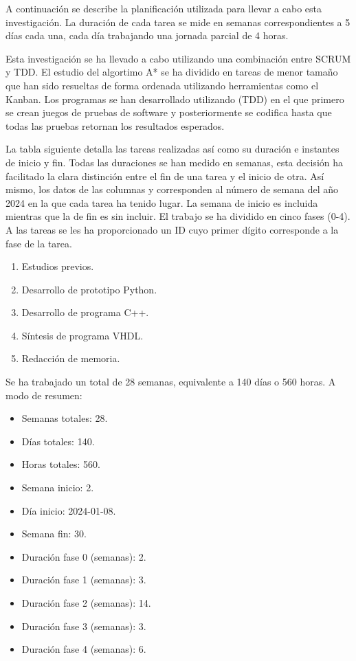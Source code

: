 \label{cha:Planificación}

A continuación se describe la planificación utilizada para llevar a cabo
esta investigación.
La duración de cada tarea se mide en semanas correspondientes a
5 días cada una, cada día trabajando una jornada parcial de 4 horas.

Esta investigación se ha llevado a cabo utilizando una combinación entre
SCRUM y TDD.
El estudio del algortimo A* se ha dividido en tareas de menor tamaño
que han sido resueltas de forma ordenada utilizando herramientas como
el Kanban.
Los programas se han desarrollado utilizando  (TDD)
en el que primero se crean juegos de pruebas de software y
posteriormente se codifica hasta que todas las pruebas retornan los resultados esperados.

La tabla siguiente detalla las tareas realizadas así como su duración e instantes
de inicio y fin.
Todas las duraciones se han medido en semanas,
esta decisión ha facilitado la clara distinción entre el fin de una tarea y
el inicio de otra.
Así mismo, los datos de las columnas  y 
corresponden al número de semana del año 2024 en la que cada tarea ha tenido lugar.
La semana de inicio es incluida mientras que la de fin es sin incluir.
El trabajo se ha dividido en cinco fases (0-4).
A las tareas se les ha proporcionado un ID cuyo primer dígito corresponde
a la fase de la tarea.

\begin{multicols}{2}
\begin{enumerate}[start=0,itemsep=0.25px]
    \item Estudios previos.
    \item Desarrollo de prototipo Python.
    \item Desarrollo de programa C++.
    \item Síntesis de programa VHDL.
    \item Redacción de memoria.
\end{enumerate}
\end{multicols}

Se ha trabajado un total de 28 semanas, equivalente a 140 días o 560 horas.
A modo de resumen:
\begin{multicols}{2}
\begin{itemize}[itemsep=0.25px]
    \item Semanas totales: 28.
    \item Días totales: 140.
    \item Horas totales: 560.
    \item Semana inicio: 2.
    \item Día inicio: 2024-01-08.
    \item Semana fin: 30.
    \item Duración fase 0 (semanas): 2.
    \item Duración fase 1 (semanas): 3.
    \item Duración fase 2 (semanas): 14.
    \item Duración fase 3 (semanas): 3.
    \item Duración fase 4 (semanas): 6.
\end{itemize}
\end{multicols}

